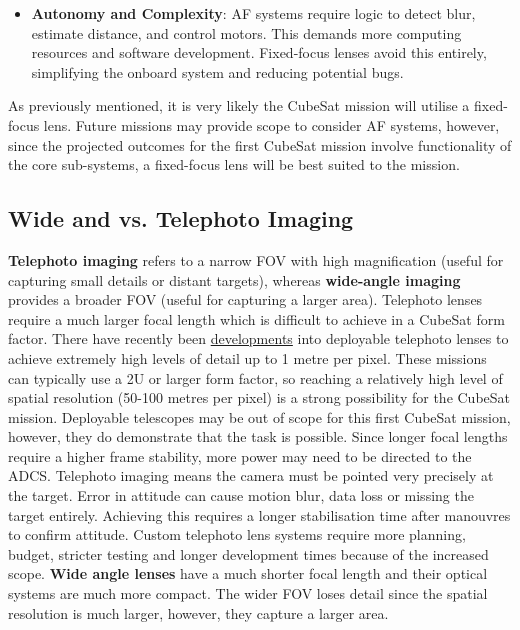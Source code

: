 \documentclass[10pt]{article}
\begin{document}
\begin{multicols}{2}
\begin{itemize}
    \item \textbf{Autonomy and Complexity}: AF systems require logic to detect blur, estimate distance, and control motors. This demands more computing resources and software development. Fixed-focus lenses avoid this entirely, simplifying the onboard system and reducing potential bugs.
\end{itemize}
As previously mentioned, it is very likely the CubeSat mission will utilise a fixed-focus lens. Future missions may provide scope to consider AF systems, however, since the projected outcomes for the first CubeSat mission involve functionality of the core sub-systems, a fixed-focus lens will be best suited to the mission.

\subsection{Wide and vs. Telephoto Imaging}
\textbf{Telephoto imaging} refers to a narrow FOV with high magnification (useful for capturing small details or distant targets), whereas \textbf{wide-angle imaging} provides a broader FOV (useful for capturing a larger area).
\newline \newline
Telephoto lenses require a much larger focal length which is difficult to achieve in a CubeSat form factor. There have recently been \href{https://digitalcommons.usu.edu/cgi/viewcontent.cgi?referer=&httpsredir=1&article=3059&context=smallsat}{developments} into deployable telephoto lenses to achieve extremely high levels of detail up to 1 metre per pixel. These missions can typically use a 2U or larger form factor, so reaching a relatively high level of spatial resolution (50-100 metres per pixel) is a strong possibility for the CubeSat mission. Deployable telescopes may be out of scope for this first CubeSat mission, however, they do demonstrate that the task is possible.
Since longer focal lengths require a higher frame stability, more power may need to be directed to the ADCS. Telephoto imaging means the camera must be pointed very precisely at the target. Error in attitude can cause motion blur, data loss or missing the target entirely. Achieving this requires a longer stabilisation time after manouvres to confirm attitude.
Custom telephoto lens systems require more planning, budget, stricter testing and longer development times because of the increased scope.
\newline \newline
\textbf{Wide angle lenses} have a much shorter focal length and their optical systems are much more compact. The wider FOV loses detail since the spatial resolution is much larger, however, they capture a larger area.

\end{multicols}
\end{document}
